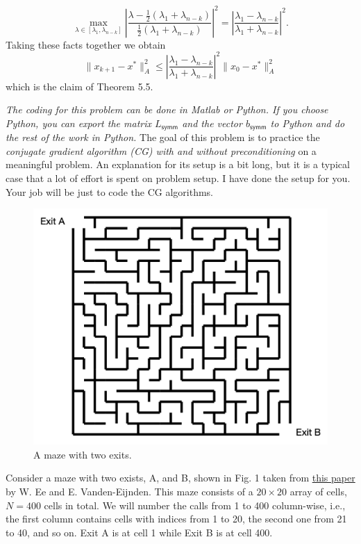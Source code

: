\documentclass{../../../kin_math}
\begin{document}
\begin{questions}
\begin{enumerate}
\begin{solution}
\begin{equation*}
        \max_{\lambda \in [\lambda_1, \lambda_{n - k}]} \left| \frac{\lambda - \frac{1}{2}(\lambda_1 + \lambda_{n - k})}{\frac{1}{2}(\lambda_1 + \lambda_{n - k})} \right|^2 = \left| \frac{\lambda_1 - \lambda_{n - k}}{\lambda_1 + \lambda_{n - k}} \right|^2.
      \end{equation*}
      Taking these facts together we obtain
      \begin{equation*}
        \lVert x_{k + 1} - x^* \rVert_A^2 \leq \left| \frac{\lambda_1 - \lambda_{n - k}}{\lambda_1 + \lambda_{n - k}} \right|^2 \lVert x_0 - x^* \rVert_A^2
      \end{equation*}
      which is the claim of Theorem 5.5.
    \end{solution}
  \end{enumerate}

  \question \emph{The coding for this problem can be done in Matlab or Python. If you choose Python, you can export the matrix $L_\textsf{symm}$ and the vector $b_\textsf{symm}$ to Python and do the rest of the work in Python.} The goal of this problem is to practice the \emph{conjugate gradient algorithm (CG) with and without preconditioning} on a meaningful problem. An explanation for its setup is a bit long, but it is a typical case that a lot of effort is spent on problem setup. I have done the setup for you. Your job will be just to code the CG algorithms.
  \begin{figure}
    \centering
    \includegraphics[scale=0.5]{maze.png}
    \caption{A maze with two exits.}
  \end{figure}
  Consider a maze with two exists, A, and B, shown in Fig. 1 taken from \href{https://www.researchgate.net/publication/23464509_Transition-Path_Theory_and_Path-Finding_Algorithms_for_the_Study_of_Rare_Events}{this paper} by W. Ee and E. Vanden-Eijnden. This maze consists of a $20 \times 20$ array of cells, $N = 400$ cells in total. We will number the calls from 1 to 400 column-wise, i.e., the first column contains cells with indices from 1 to 20, the second one from 21 to 40, and so on. Exit A is at cell 1 while Exit B is at cell 400.


\end{questions}
\end{document}
